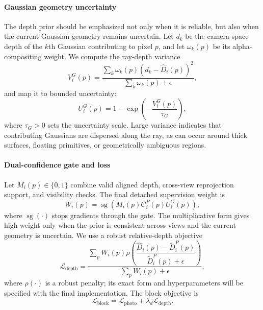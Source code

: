\documentclass[conference]{IEEEtran}
\begin{document}
\paragraph{Gaussian geometry uncertainty}
The depth prior should be emphasized not only when it is reliable, but also when the current Gaussian geometry remains uncertain. Let $d_k$ be the camera-space depth of the $k$th Gaussian contributing to pixel $p$, and let $\omega_k(p)$ be its alpha-compositing weight. We compute the ray-depth variance
\begin{equation}
V_i^G(p)=
\frac{\sum_k\omega_k(p)\left(d_k-\hat D_i(p)\right)^2}
{\sum_k\omega_k(p)+\epsilon},
\label{eq:rayvariance}
\end{equation}
and map it to bounded uncertainty:
\begin{equation}
U_i^G(p)=1-\exp\left(-\frac{V_i^G(p)}{\tau_G}\right),
\label{eq:geometryuncertainty}
\end{equation}
where $\tau_G>0$ sets the uncertainty scale. Large variance indicates that contributing Gaussians are dispersed along the ray, as can occur around thick surfaces, floating primitives, or geometrically ambiguous regions.

\paragraph{Dual-confidence gate and loss}
Let $M_i(p)\in\{0,1\}$ combine valid aligned depth, cross-view reprojection support, and visibility checks. The final detached supervision weight is
\begin{equation}
W_i(p)=\operatorname{sg}\!\left(M_i(p)C_i^P(p)U_i^G(p)\right),
\label{eq:dualgate}
\end{equation}
where $\operatorname{sg}(\cdot)$ stops gradients through the gate. The multiplicative form gives high weight only when the prior is consistent across views and the current geometry is uncertain. We use a robust relative-depth objective
\begin{equation}
\mathcal{L}_{\mathrm{depth}}=
\frac{\sum_pW_i(p)\rho\!\left(
\dfrac{\hat D_i(p)-\widetilde D_i^P(p)}
{\widetilde D_i^P(p)+\epsilon}\right)}
{\sum_pW_i(p)+\epsilon},
\label{eq:depthloss}
\end{equation}
where $\rho(\cdot)$ is a robust penalty; its exact form and hyperparameters will be specified with the final implementation. The block objective is
\begin{equation}
\mathcal{L}_{\mathrm{block}}=\mathcal{L}_{\mathrm{photo}}
+\lambda_d\mathcal{L}_{\mathrm{depth}}.
\label{eq:blockloss}
\end{equation}
\end{document}
